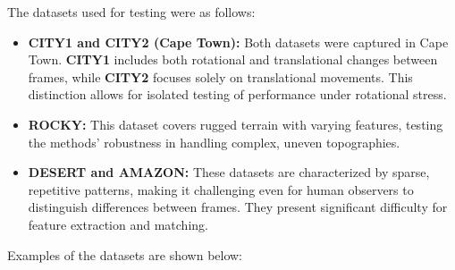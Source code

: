 The datasets used for testing were as follows:

\begin{itemize}
    \item \textbf{CITY1 and CITY2 (Cape Town):}  
    Both datasets were captured in Cape Town. \textbf{CITY1} includes both rotational and translational changes between frames, while \textbf{CITY2} focuses solely on translational movements. This distinction allows for isolated testing of performance under rotational stress.
    
    \item \textbf{ROCKY:}  
    This dataset covers rugged terrain with varying features, testing the methods' robustness in handling complex, uneven topographies.
    
    \item \textbf{DESERT and AMAZON:}  
    These datasets are characterized by sparse, repetitive patterns, making it challenging even for human observers to distinguish differences between frames. They present significant difficulty for feature extraction and matching.
\end{itemize}

Examples of the datasets are shown below:

